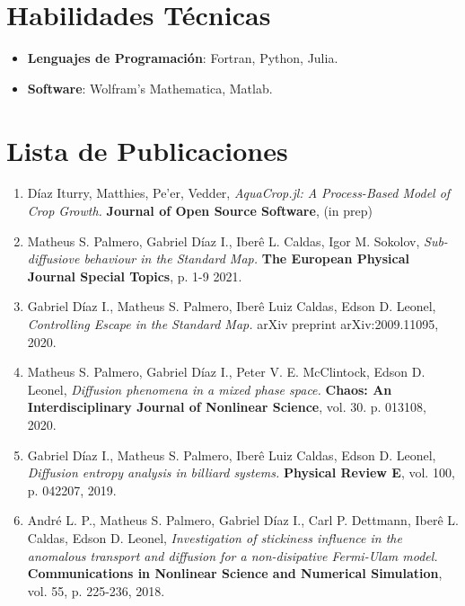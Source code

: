 \documentclass[margin,line]{resume}
\begin{document}
\begin{resume}
\section{\mysidestyle Habilidades T\'ecnicas}
\begin{itemize}
     \item {\bf Lenguajes de Programaci\'on}: Fortran, Python, Julia.
     \item {\bf Software}: Wolfram's Mathematica, Matlab.
\end{itemize}

    \section{\mysidestyle Lista de Publicaciones}
\begin{enumerate}

\item D\'iaz Iturry, Matthies, Pe'er, Vedder, {\it AquaCrop.jl: A Process-Based Model of Crop Growth.} {\bf Journal of Open Source Software}, (in prep)

\item Matheus S. Palmero, Gabriel D\'iaz I., Iber\^e L. Caldas, Igor M. Sokolov, {\it Sub-diffusiove behaviour in the Standard Map.} {\bf The European Physical Journal Special Topics}, p. 1-9 2021.

\item Gabriel D\'iaz I., Matheus S. Palmero, Iber\^e Luiz Caldas, Edson D. Leonel, {\it Controlling Escape in the Standard Map.} arXiv preprint arXiv:2009.11095, 2020.

\item Matheus S. Palmero, Gabriel D\'iaz I., Peter V. E. McClintock, Edson D. Leonel, {\it Diffusion phenomena in a mixed phase space.} {\bf Chaos: An Interdisciplinary Journal of Nonlinear Science}, vol. 30. p. 013108, 2020.

\item Gabriel D\'iaz I., Matheus S. Palmero, Iber\^e Luiz Caldas, Edson D. Leonel, {\it Diffusion entropy analysis in billiard systems.} {\bf Physical Review E}, vol. 100, p. 042207, 2019.

\item Andr\'e L. P., Matheus S. Palmero, Gabriel D\'iaz I., Carl P. Dettmann, Iber\^e L. Caldas, Edson D. Leonel, {\it Investigation of stickiness influence in the anomalous transport and diffusion for a non-disipative Fermi-Ulam model.} {\bf Communications in Nonlinear Science and Numerical Simulation}, vol. 55, p. 225-236, 2018.


\end{enumerate}
\end{resume}
\end{document}
